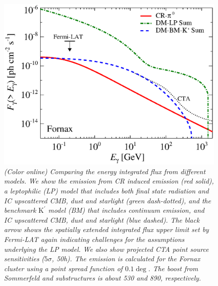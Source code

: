 \documentclass[10pt,aps,pra,reprint,amsmath,amsfonts,amssymb,showpacs,nofootinbib,floatfix]{revtex4-1}
\newcommand{\Fermi}{{\em Fermi}\xspace}
\newcommand{\rmn}{\mathrm}
\newcommand{\Kp}{\rmn{K}^\prime}
\begin{document}
\begin{figure}
 \includegraphics[width=0.99\columnwidth]{figures/flux.int.v14.0.1deg.1.6T.SubMass.SF700.IR2.noMW.woGal.eps}
 \caption{\it (Color online) Comparing the energy integrated flux from
   different models. We show the emission from CR induced emission
   (red solid), a leptophilic (LP) model that includes both final
   state radiation and IC upscattered CMB, dust and starlight (green
   dash-dotted), and the benchmark $\Kp$ model (BM) that includes
   continuum emission, and IC upscattered CMB, dust and starlight
   (blue dashed). The black arrow shows the spatially extended
   integrated flux upper limit set by \Fermi-LAT again indicating
   challenges for the assumptions underlying the LP model. We also
   show projected CTA point source sensitivities ($5\sigma$, 50h). The
   emission is calculated for the Fornax cluster using a point spread
   function of $0.1\deg$. The boost from Sommerfeld and substructures
   is about 530 and 890, respectively.}
 \label{fig:flux_int}
\end{figure}
\end{document}
